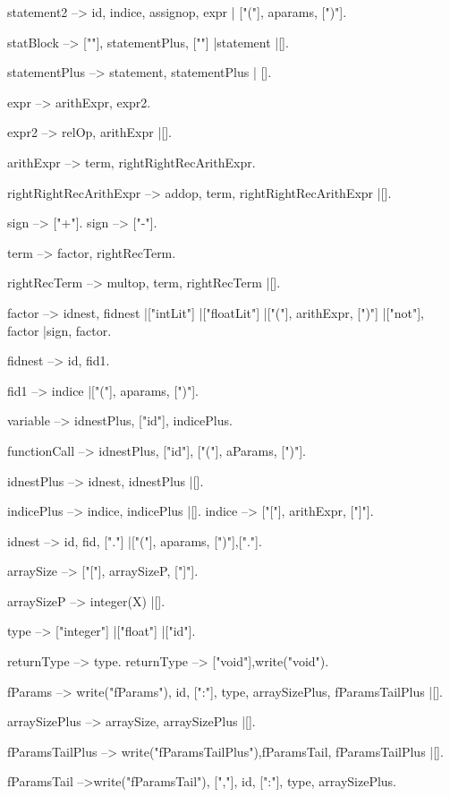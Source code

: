 \documentclass{article}
\begin{document}
statement2 --> id, indice, assignop, expr
	       | ["("], aparams, [")"].


statBlock --> ["{"], statementPlus, ["}"]
	      |statement
	      |[].

statementPlus --> statement, statementPlus
		  | [].

expr --> arithExpr, expr2.

expr2 --> relOp, arithExpr
	  |[].



arithExpr --> term, rightRightRecArithExpr.

rightRightRecArithExpr --> addop, term, rightRightRecArithExpr
			   |[].

sign --> ["+"].
sign --> ["-"].

term --> factor, rightRecTerm.

rightRecTerm --> multop, term, rightRecTerm
		 |[].

factor --> idnest, fidnest
	   |["intLit"]
	   |["floatLit"]
	   |["("], arithExpr, [")"]
	   |["not"], factor
	   |sign, factor.

fidnest --> id, fid1.

fid1 --> indice
	 |["("], aparams, [")"].

variable --> idnestPlus, ["id"], indicePlus.

functionCall --> idnestPlus, ["id"], ["("], aParams, [")"].

idnestPlus --> idnest, idnestPlus
	       |[].

indicePlus -->  indice, indicePlus
		|[].
indice --> ["["], arithExpr, ["]"].

idnest -->  id, fid, ["."]
	   |["("], aparams, [")"],["."].

arraySize --> ["["], arraySizeP, ["]"].

arraySizeP --> integer(X)
	       |[].

type --> ["integer"]
	 |["float"]
	 |["id"].


returnType --> type.
returnType --> ["void"],{write("void")}.

fParams --> {write("fParams")}, id, [":"], type, arraySizePlus, fParamsTailPlus
	    |[].


arraySizePlus --> arraySize, arraySizePlus
		  |[].

fParamsTailPlus -->  {write("fParamsTailPlus")},fParamsTail, fParamsTailPlus
		     |[].

fParamsTail -->{write("fParamsTail")}, [","], id, [":"], type, arraySizePlus.
\end{document}
